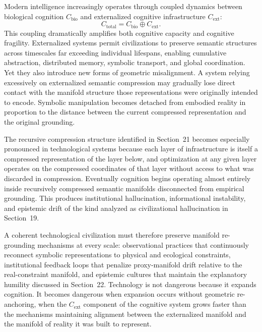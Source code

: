\documentclass[11pt,a4paper,twocolumn]{article}
\begin{document}
Modern intelligence increasingly operates through coupled
dynamics between biological cognition $C_{\mathrm{bio}}$
and externalized cognitive infrastructure $C_{\mathrm{ext}}$:
\[
C_{\mathrm{total}} = C_{\mathrm{bio}} \oplus C_{\mathrm{ext}}.
\]
This coupling dramatically amplifies both cognitive capacity
and cognitive fragility. Externalized systems permit
civilizations to preserve semantic structures across
timescales far exceeding individual lifespans, enabling
cumulative abstraction, distributed memory, symbolic
transport, and global coordination. Yet they also introduce
new forms of geometric misalignment. A system relying
excessively on externalized semantic compression may
gradually lose direct contact with the manifold structure
those representations were originally intended to encode.
Symbolic manipulation becomes detached from embodied
reality in proportion to the distance between the current
compressed representation and the original grounding.

The recursive compression structure identified in Section~21
becomes especially pronounced in technological systems
because each layer of infrastructure is itself a compressed
representation of the layer below, and optimization at any
given layer operates on the compressed coordinates of that
layer without access to what was discarded in compression.
Eventually cognition begins operating almost entirely inside
recursively compressed semantic manifolds disconnected from
empirical grounding. This produces institutional
hallucination, informational instability, and epistemic drift
of the kind analyzed as civilizational hallucination in
Section~19.

A coherent technological civilization must therefore
preserve manifold re-grounding mechanisms at every scale:
observational practices that continuously reconnect
symbolic representations to physical and ecological
constraints, institutional feedback loops that penalize
proxy-manifold drift relative to the real-constraint
manifold, and epistemic cultures that maintain the
explanatory humility discussed in Section~22. Technology
is not dangerous because it expands cognition. It becomes
dangerous when expansion occurs without geometric
re-anchoring, when the $C_{\mathrm{ext}}$ component of
the cognitive system grows faster than the mechanisms
maintaining alignment between the externalized manifold
and the manifold of reality it was built to represent.

\end{document}
